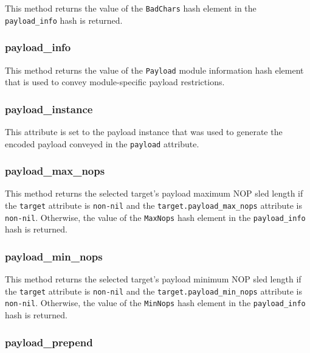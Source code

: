\documentclass{report}
\begin{document}
\par
This method returns the value of the \texttt{BadChars} hash element
in the \texttt{payload\_info} hash is returned.

            \subsubsection{payload\_info}

\par
This method returns the value of the \texttt{Payload} module
information hash element that is used to convey module-specific
payload restrictions.

            \subsubsection{payload\_instance}

\par
This attribute is set to the payload instance that was used to
generate the encoded payload conveyed in the \texttt{payload}
attribute.

            \subsubsection{payload\_max\_nops}

\par
This method returns the selected target's payload maximum NOP sled
length if the \texttt{target} attribute is \texttt{non-nil} and the
\texttt{target.payload\_max\_nops} attribute is \texttt{non-nil}.
Otherwise, the value of the \texttt{MaxNops} hash element in the
\texttt{payload\_info} hash is returned.

            \subsubsection{payload\_min\_nops}
\par
This method returns the selected target's payload minimum NOP sled
length if the \texttt{target} attribute is \texttt{non-nil} and the
\texttt{target.payload\_min\_nops} attribute is \texttt{non-nil}.
Otherwise, the value of the \texttt{MinNops} hash element in the
\texttt{payload\_info} hash is returned.

            \subsubsection{payload\_prepend}
\end{document}
